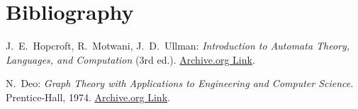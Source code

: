 \documentclass{article}
\theoremstyle{theorem}
\theoremstyle{definition}
\theoremstyle{remark}
\begin{document}
\newpage

\section{Bibliography}
\begin{thebibliography}{99}

  J.~E.~Hopcroft, R.~Motwani, J.~D.~Ullman:  
  \emph{Introduction to Automata Theory, Languages, and Computation} (3rd ed.).  
  \href{https://archive.org/details/hopcroft-motwani-ullman-introduction-to-automata-theory-languages-and-computations-3rd-edition/page/65/mode/1up?view=theater}{Archive.org Link}.
  
  N.~Deo:  
  \emph{Graph Theory with Applications to Engineering and Computer Science}.  
  Prentice-Hall, 1974.  
  \href{https://archive.org/details/GraphTheoryWithApplicationsToEngineeringAndComputerScience/page/n108/mode/1up?view=theater}{Archive.org Link}.
  
  \end{thebibliography}
\end{document}

